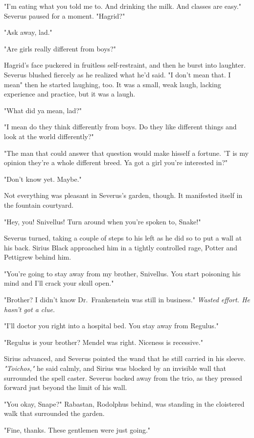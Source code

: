 "I'm eating what you told me to. And drinking the milk. And classes are easy." Severus paused for a moment. "Hagrid?"

"Ask away, lad."

"Are girls really different from boys?"

Hagrid's face puckered in fruitless self-restraint, and then he burst into laughter. Severus blushed fiercely as he realized what he'd said. "I don't mean that. I mean{\el}" then he started laughing, too. It was a small, weak laugh, lacking experience and practice, but it was a laugh.

"What did ya mean, lad?"

"I mean do they think differently from boys. Do they like different things and look at the world differently?"

"The man that could answer that question would make hisself a fortune. 'T is my opinion they're a whole different breed. Ya got a girl you're interested in?"

"Don't know yet. Maybe."

Not everything was pleasant in Severus's garden, though. It manifested itself in the fountain courtyard.

"Hey, you! Snivellus! Turn around when you're spoken to, Snake!"

Severus turned, taking a couple of steps to his left as he did so to put a wall at his back. Sirius Black approached him in a tightly controlled rage, Potter and Pettigrew behind him.

"You're going to stay away from my brother, Snivellus. You start poisoning his mind and I'll crack your skull open."

"Brother? I didn't know Dr.~Frankenstein was still in business." \emph{Wasted effort. He hasn't got a clue.}

"I'll doctor you right into a hospital bed. You stay away from Regulus."

"Regulus is your brother? Mendel was right. Niceness is recessive."

Sirius advanced, and Severus pointed the wand that he still carried in his sleeve. \emph{"Toichos,"} he said calmly, and Sirius was blocked by an invisible wall that surrounded the spell caster. Severus backed away from the trio, as they pressed forward just beyond the limit of his wall.

"You okay, Snape?" Rabastan, Rodolphus behind, was standing in the cloistered walk that surrounded the garden.

"Fine, thanks. These gentlemen were just going."

